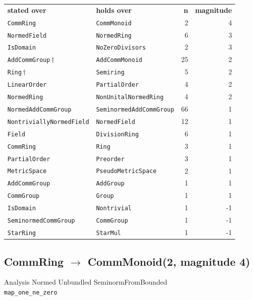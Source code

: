 \documentclass[10pt,a4paper]{article}
\begin{document}
\begin{center}
\begin{tabular}{llrr}
\textbf{stated over} & \textbf{holds over} & \textbf{n} & \textbf{magnitude}\\[2pt]
\texttt{\small CommRing} & \texttt{\small CommMonoid} & 2 & 4\\
\texttt{\small NormedField} & \texttt{\small NormedRing} & 6 & 3\\
\texttt{\small IsDomain} & \texttt{\small NoZeroDivisors} & 2 & 3\\
\texttt{\small AddCommGroup}\,$\dagger$ & \texttt{\small AddCommMonoid} & 25 & 2\\
\texttt{\small Ring}\,$\dagger$ & \texttt{\small Semiring} & 5 & 2\\
\texttt{\small LinearOrder} & \texttt{\small PartialOrder} & 4 & 2\\
\texttt{\small NormedRing} & \texttt{\small NonUnitalNormedRing} & 4 & 2\\
\texttt{\small NormedAddCommGroup} & \texttt{\small SeminormedAddCommGroup} & 66 & 1\\
\texttt{\small NontriviallyNormedField} & \texttt{\small NormedField} & 12 & 1\\
\texttt{\small Field} & \texttt{\small DivisionRing} & 6 & 1\\
\texttt{\small CommRing} & \texttt{\small Ring} & 3 & 1\\
\texttt{\small PartialOrder} & \texttt{\small Preorder} & 3 & 1\\
\texttt{\small MetricSpace} & \texttt{\small PseudoMetricSpace} & 2 & 1\\
\texttt{\small AddCommGroup} & \texttt{\small AddGroup} & 1 & 1\\
\texttt{\small CommGroup} & \texttt{\small Group} & 1 & 1\\
\texttt{\small IsDomain} & \texttt{\small Nontrivial} & 1 & -1\\
\texttt{\small SeminormedCommGroup} & \texttt{\small CommGroup} & 1 & -1\\
\texttt{\small StarRing} & \texttt{\small StarMul} & 1 & -1\\
\end{tabular}
\end{center}

\subsection*{CommRing $\to$ CommMonoid\quad\textmd{\small (2, magnitude 4)}}
{\footnotesize\color{locator}Analysis\,\textperiodcentered\,Normed\,\textperiodcentered\,Unbundled\,\textperiodcentered\,SeminormFromBounded}\\
\hspace*{1em}\texttt{\small map\_one\_ne\_zero}\\
\end{document}
